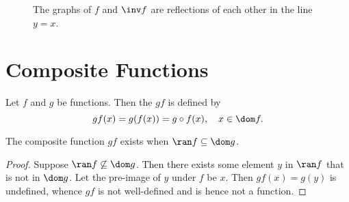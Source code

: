 \begin{figure}[H]
    \centering
    \caption{The graphs of $f$ and $\inv f$ are reflections of each other in the line $y = x$.}
\end{figure}

\section{Composite Functions}

\begin{definition}
    Let $f$ and $g$ be functions. Then the  $gf$ is defined by \[gf(x) = g(f(x)) = g \circ f(x), \quad x \in \dom f.\]
\end{definition}

\begin{proposition}
    The composite function $gf$ exists when $\ran f \subseteq \dom g$.
\end{proposition}
\begin{proof}
    Suppose $\ran f \not\subseteq \dom g$. Then there exists some element $y$ in $\ran f$ that is not in $\dom g$. Let the pre-image of $y$ under $f$ be $x$. Then $gf(x) = g(y)$ is undefined, whence $gf$ is not well-defined and is hence not a function.
\end{proof}

